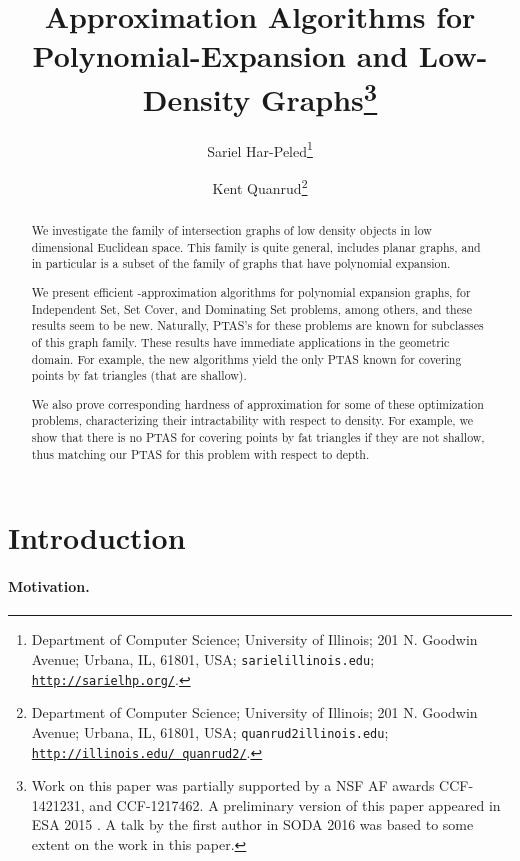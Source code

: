 \documentclass[12pt]{article}
\newcommand{\Term}[1]{\textsf{#1}}
\theoremstyle{remark}\theoremheaderfont{\sf}\theorembodyfont{\upshape}
\numberwithin{figure}{section}\numberwithin{table}{section}\numberwithin{equation}{section}
\newcommand{\ProblemC}[1]{\textsf{#1}}
\newcommand{\PTAS}{\Term{PTAS}\xspace}
\newcommand{\atgen}{\symbol{'100}}
\newcommand{\KentThanks}{\thanks{Department of Computer Science; University of Illinois; 201 N. Goodwin Avenue; Urbana, IL, 61801, USA; {\tt quanrud2\atgen{}illinois.edu}; {\tt\href {http://illinois.edu/\string~quanrud2/}{http://illinois.edu/\string~quanrud2/}}. }}\newcommand{\SarielThanks}[1][]{\thanks{Department of Computer Science; University of Illinois; 201 N. Goodwin Avenue; Urbana, IL, 61801, USA; {\tt sariel\atgen{}illinois.edu}; {\tt \url{http://sarielhp.org/}}. #1}}
\begin{document}
\title{Approximation Algorithms for Polynomial-Expansion and
  Low-Density Graphs\thanks{Work on this paper was partially supported by a NSF AF
    awards CCF-1421231, and CCF-1217462. A preliminary version of this paper appeared in E{S}A 2015
    \cite{hq-aapel-15}. A talk by the first author in SODA 2016 was
    based to some extent on the work in this paper.}}

\author{Sariel Har-Peled\SarielThanks{}\and Kent Quanrud\KentThanks{}}


\maketitle





\begin{abstract}
  We investigate the family of intersection graphs of low density
  objects in low dimensional Euclidean space.  This family is quite
  general, includes planar graphs, and in particular is a subset of
  the family of graphs that have polynomial expansion.

  We present efficient -approximation algorithms for
  polynomial expansion graphs, for \ProblemC{Independent Set},
  \ProblemC{Set Cover}, and \ProblemC{Dominating Set} problems, among
  others, and these results seem to be new. Naturally, \PTAS{}'s for
  these problems are known for sub{}classes of this graph family.
  These results have immediate applications in the geometric
  domain. For example, the new algorithms yield the only \PTAS known
  for covering points by fat triangles (that are shallow).

  We also prove corresponding hardness of approximation for some of
  these optimization problems, characterizing their intractability
  with respect to density. For example, we show that there is no \PTAS
  for covering points by fat triangles if they are not shallow, thus
  matching our \PTAS for this problem with respect to depth.
\end{abstract}

\section{Introduction}

\paragraph{Motivation.}
\end{document}

